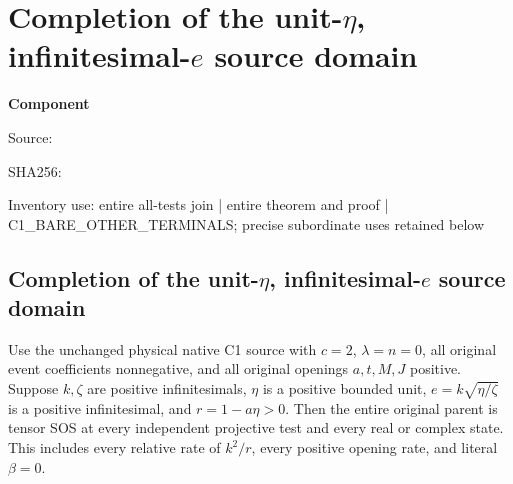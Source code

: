 \chapter{Completion of the unit-$\eta$, infinitesimal-$e$ source domain}
\label{component:p29aeda9b68a4}
\noindent\textbf{Component }\par
{\small\noindent Source: \par}
{\small\noindent SHA256: \par}
{\small\noindent Inventory use: entire all-tests join | entire theorem and proof | C1\_\allowbreak{}BARE\_\allowbreak{}OTHER\_\allowbreak{}TERMINALS; precise subordinate uses retained below\par}
\medskip
\section[Completion of the unit-eta, infinitesimal-e source domain]{Completion of the unit-$\eta$, infinitesimal-$e$ source domain}

\begin{theorem}
Use the unchanged physical native C1 source with $c=2$, $\lambda=n=0$,
all original event coefficients nonnegative, and all original openings
$a,t,M,J$ positive. Suppose $k,\zeta$ are positive infinitesimals,
$\eta$ is a positive bounded unit, $e=k\sqrt{\eta/\zeta}$ is a positive
infinitesimal, and $r=1-a\eta>0$. Then the entire original parent is
tensor SOS at every independent projective test and every real or
complex state. This includes every relative rate of $k^2/r$, every
positive opening rate, and literal $\beta=0$.
\end{theorem}

